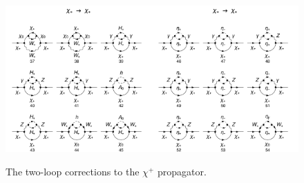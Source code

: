 \documentclass[11pt]{article}
\begin{document}
\begin{figure}[h!]
\includegraphics[width=0.5\textwidth]{diagrams_F[1]_2_5.pdf}\includegraphics[width=0.5\textwidth]{diagrams_F[1]_2_6.pdf}
\caption{The two-loop corrections to the $\chi^+$ propagator.}\label{fig:chi1chi1_1}
\end{figure}
\end{document}
